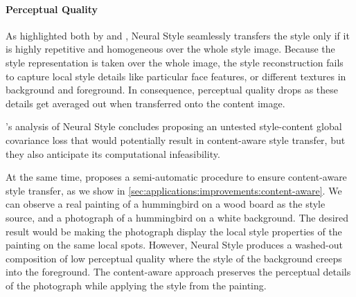 \paragraph{Perceptual Quality}
As highlighted both by \citet{Nikulin2016} and \citet{Yin2016}, Neural Style seamlessly transfers the style only if it is highly repetitive and homogeneous over the whole style image.
Because the style representation is taken over the whole image, the style reconstruction fails to capture local style details like particular face features, or different textures in background and foreground.
In consequence, perceptual quality drops as these details get averaged out when transferred onto the content image.

\citeauthor{Nikulin2016}'s analysis of Neural Style concludes proposing an untested style-content global covariance loss that would potentially result in content-aware style transfer, but they also anticipate its computational infeasibility.

At the same time, \citeauthor{Yin2016} proposes a semi-automatic procedure to ensure content-aware style transfer, as we show in \autoref{sec:applications:improvements:content-aware}.
We can observe a real painting of a hummingbird on a wood board as the style source, and a photograph of a hummingbird on a white background.
The desired result would be making the photograph display the local style properties of the painting on the same local spots.
However, Neural Style produces a washed-out composition of low perceptual quality where the style of the background creeps into the foreground.
The content-aware approach preserves the perceptual details of the photograph while applying the style from the painting.

